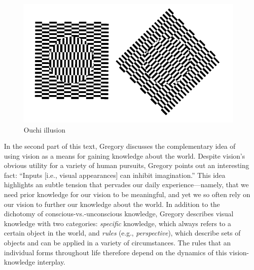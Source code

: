 \documentclass[12pt]{article} %
\begin{document}
\begin{figure}[h]
\centering
\includegraphics[scale=.40]{./images/ouchi.png}
\caption{Ouchi illusion}
\label{ouchi}
\end{figure}

In the second part of this text, Gregory discusses the complementary idea of using vision as a means for gaining knowledge about the world. 
Despite vision's obvious utility for a variety of human pursuits, Gregory points out an interesting fact: ``Inputs [i.e., visual appearances] can inhibit imagination.'' This idea highlights an subtle tension that pervades our daily experience---namely, that we need prior knowledge for our vision to be meaningful, and yet we so often rely on our vision to further our knowledge about the world. In addition to the dichotomy of conscious-vs.-unconscious knowledge, Gregory describes visual knowledge with two categories: \textit{specific} knowledge, which always refers to a certain object in the world, and \textit{rules} (e.g., \textit{perspective}), which describe sets of objects and can be applied in a variety of circumstances. The rules that an individual forms throughout life therefore depend on the dynamics of this vision-knowledge interplay.

\pagebreak[4]
\end{document}
